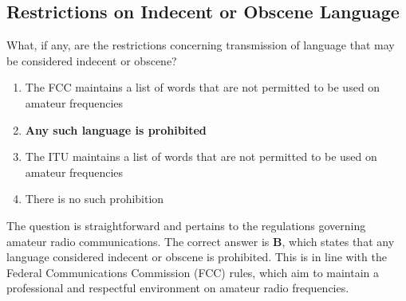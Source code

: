 \subsection{Restrictions on Indecent or Obscene Language}
\label{T1D06}

\begin{tcolorbox}[colback=gray!10!white,colframe=black!75!black,title=T1D06]
What, if any, are the restrictions concerning transmission of language that may be considered indecent or obscene?
\begin{enumerate}[label=\Alph*),noitemsep]
    \item The FCC maintains a list of words that are not permitted to be used on amateur frequencies
    \item \textbf{Any such language is prohibited}
    \item The ITU maintains a list of words that are not permitted to be used on amateur frequencies
    \item There is no such prohibition
\end{enumerate}
\end{tcolorbox}

The question is straightforward and pertains to the regulations governing amateur radio communications. The correct answer is \textbf{B}, which states that any language considered indecent or obscene is prohibited. This is in line with the Federal Communications Commission (FCC) rules, which aim to maintain a professional and respectful environment on amateur radio frequencies.